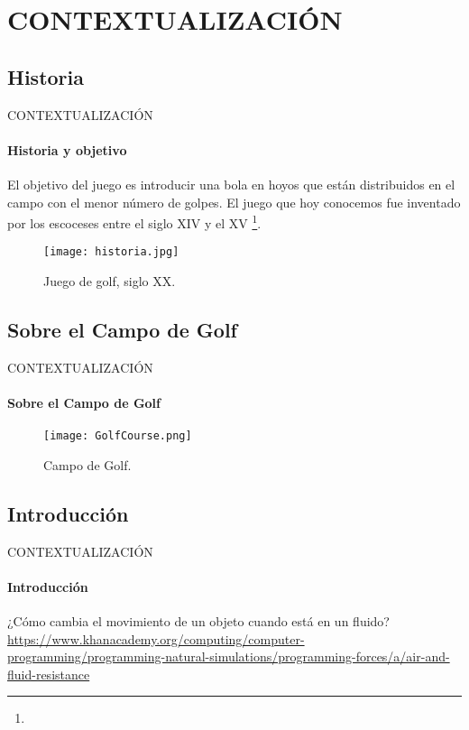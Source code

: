 \section{CONTEXTUALIZACIÓN}
\subsection{Historia}
\begin{frame}{CONTEXTUALIZACIÓN}
\framesubtitle{Historia y objetivo}
	El objetivo del juego es introducir una bola en hoyos que están distribuidos en el campo con el menor número de golpes. El juego que hoy conocemos fue inventado por los escoceses entre el siglo XIV y el XV \footnote{}.
    \begin{figure}[H]
      \centering
      \texttt{[image: historia.jpg]}
      \caption{Juego de golf, siglo XX\footnotemark{}.}
	\end{figure}
\end{frame}
\subsection{Sobre el Campo de Golf}
\begin{frame}{CONTEXTUALIZACIÓN}
\framesubtitle{Sobre el Campo de Golf}
	\begin{figure}[H]
      \centering
      \texttt{[image: GolfCourse.png]}
      \caption{Campo de Golf.}
	\end{figure}
\end{frame}
\subsection{Introducción}
\begin{frame}{CONTEXTUALIZACIÓN}
\framesubtitle{Introducción}
¿Cómo cambia el movimiento de un objeto cuando está en un fluido?\\
\url{https://www.khanacademy.org/computing/computer-programming/programming-natural-simulations/programming-forces/a/air-and-fluid-resistance}
\end{frame}


